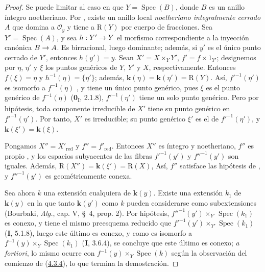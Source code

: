 \documentclass[10pt,oneside,openany]{book}
\theoremstyle{egaenv}\newtheorem*{env}{---}
\theoremstyle{egastatement}
\theoremstyle{egadescription}
\newcommand{\oldpage}[2][]{\marginnote{\normalfont\scriptsize\textbf{#1}\,|\,#2}\ignorespaces}
\renewcommand{\to}{\mathchoice{\longrightarrow}{\rightarrow}{\rightarrow}{\rightarrow}}
\begin{document}
\begin{proof}
Se puede limitar al caso en que $Y=\operatorname{Spec}(B)$, donde $B$ es un anillo
íntegro noetheriano. Por , existe un anillo local
\emph{noetheriano integralmente cerrado} $A$ que domina a $\mathcal O_y$ y tiene a
$\mathrm R(Y)$ por cuerpo de fracciones. Sea $Y'=\operatorname{Spec}(A)$, y
sea $h:Y'\to Y$ el morfismo correspondiente a la inyección canónica
$B\to A$. Es birracional, luego dominante; además, si $y'$ es el
único punto cerrado de $Y'$, entonces $h(y')=y$. Sean
\oldpage[III]{134}
$X'=X\times_YY'$, $f'=f\times1_{Y'}$; designemos por $\eta$, $\eta'$ y $\xi$ los puntos genéricos de $Y$, $Y'$ y
$X$, respectivamente. Entonces $f(\xi)=\eta$ y
$h^{-1}(\eta)=\{\eta'\}$; además,
$\boldsymbol{k}(\eta)=\boldsymbol{k}(\eta')=\mathrm R(Y)$. Así, $f'^{-1}(\eta')$ es
isomorfo a $f^{-1}(\eta)$ , y tiene un único punto
genérico, pues $\xi$ es el punto genérico de
$f^{-1}(\eta)$ (\textbf{0}\textsubscript{I}, 2.1.8),
$f'^{-1}(\eta')$ tiene un solo punto genérico. Pero por hipótesis, toda
componente irreducible de $X'$ tiene su punto genérico en
$f'^{-1}(\eta')$. Por tanto, $X'$ es irreducible; su punto genérico
$\xi'$ es el de $f'^{-1}(\eta')$, y
$\boldsymbol{k}(\xi')=\boldsymbol{k}(\xi)$.



Pongamos $X''=X'_{\mathrm{red}}$ y $f''=f'_{\mathrm{red}}$. Entonces
$X''$ es íntegro y noetheriano, $f''$ es propio
, y los espacios subyacentes de las fibras
$f'^{-1}(y')$ y $f''^{-1}(y')$ son iguales. Además,
$\mathrm R(X'')=\boldsymbol{k}(\xi')=\mathrm R(X)$,
Así, $f''$ satisface las hipótesis de , y
$f''^{-1}(y')$ es geométricamente conexa.

Sea ahora $k$ una extensión cualquiera de $\boldsymbol{k}(y)$. Existe una
extensión $k_1$ de $\boldsymbol{k}(y)$ en la que tanto $\boldsymbol{k}(y')$ como $k$ pueden considerarse como subextensiones (Bourbaki, \emph{Alg.}, cap. V, \S~4, prop. 2). Por hipótesis, $f''^{-1}(y')\times_{Y'}\operatorname{Spec}(k_1)$ es conexo, y tiene el mismo preesquema reducido que $f'^{-1}(y')\times_{Y'}\operatorname{Spec}(k_1)$ (\textbf{I}, 5.1.8), luego este último es conexo, y como es isomorfo a $f^{-1}(y)\times_Y\operatorname{Spec}(k_1)$ (\textbf{I}, 3.6.4), se concluye que este último es conexo; \emph{a fortiori}, lo mismo ocurre con $f^{-1}(y)\times_Y\operatorname{Spec}(k)$ según la observación del comienzo de (\hyperref[III.4.3.4-fr]{4.3.4}), lo que termina la demostración.
\end{proof}
\end{document}
